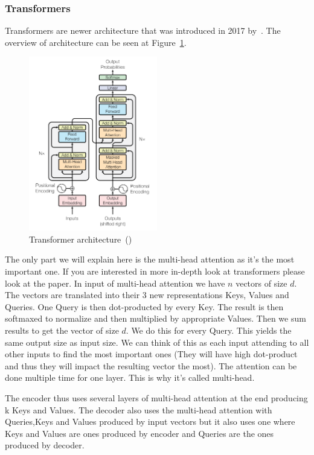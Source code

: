 \documentclass{article}
\begin{document}
    \subsubsection{Transformers}
    Transformers are newer architecture that was introduced in 2017 by~\cite{vaswaniAttentionAllYou2017b}.
    The overview of architecture can be seen at Figure~\ref{fig:transformer}.
    \begin{figure}[h!]
        \centering
        \includegraphics[width=0.5\textwidth]{attention.png}
        \caption{Transformer architecture~(\cite{vaswaniAttentionAllYou2017b})}
        \label{fig:transformer}
    \end{figure}
    The only part we will explain here is the multi-head attention as it's the most important one.
    If you are interested in more in-depth look at transformers please look at the paper.
    In input of multi-head attention we have $n$ vectors of size $d$. The vectors are translated into their 3 new representations Keys, Values and Queries.
    One Query is then dot-producted by every Key. The result is then softmaxed to normalize and then multiplied by appropriate Values.
    Then we sum results to get the vector of size $d$. We do this for every Query.
    This yields the same output size as input size. We can think of this as each input attending to all other inputs to find the most important ones (They will have high dot-product and thus they will impact the resulting vector the most).
    The attention can be done multiple time for one layer. This is why it's called multi-head.

    The encoder thus uses several layers of multi-head attention at the end producing k Keys and Values.
    The decoder also uses the multi-head attention with Queries,Keys and Values produced by input vectors but it also uses one
    where Keys and Values are ones produced by encoder and Queries are the ones produced by decoder.
\end{document}
